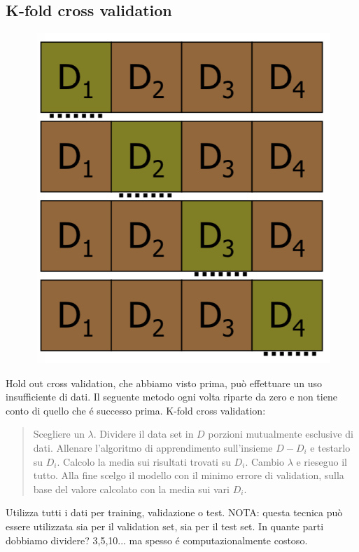 \documentclass{article}
\begin{document}
\subsection{K-fold cross validation}
\begin{figure}[H]
\centering
\includegraphics[scale=0.5]{Images/kfold.png}
\end{figure}
Hold out cross validation, che abbiamo visto prima, può effettuare un uso insufficiente di dati. Il seguente metodo ogni volta riparte da zero e non tiene conto di quello che é successo prima. \newline
K-fold cross validation:
\begin{quote}
    Scegliere un $\lambda$. Dividere il data set in $D$ porzioni mutualmente esclusive di dati. Allenare l'algoritmo di apprendimento sull'insieme $D - D_i$ e testarlo su $D_i$. Calcolo la media sui risultati trovati su $D_i$. Cambio $\lambda$ e rieseguo il tutto. Alla fine scelgo il modello con il minimo errore di validation, sulla base del valore calcolato con la media sui vari $D_i$.
\end{quote}
Utilizza tutti i dati per training, validazione o test. NOTA: questa tecnica può essere utilizzata sia per il validation set, sia per il test set. In quante parti dobbiamo dividere? 3,5,10... ma spesso é computazionalmente costoso. 
\end{document}
